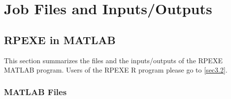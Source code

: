 \documentclass[12pt] {article}
\begin{document}
\section{Job Files and Inputs/Outputs}
\label{sec3}

\subsection{RPEXE in MATLAB}
\label{sec3.1}


This section summarizes the files and the inputs/outputs of the
RPEXE MATLAB program.
Users of the RPEXE R program please go to
\ref{sec3.2}.


\subsubsection{MATLAB Files}
\end{document}

